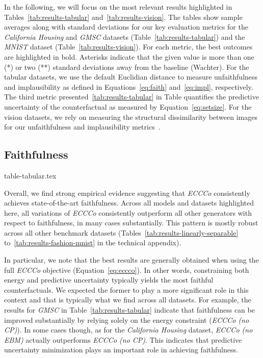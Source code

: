 In the following, we will focus on the most relevant results highlighted in Tables~\ref{tab:results-tabular} and~\ref{tab:results-vision}. The tables show sample averages along with standard deviations for our key evaluation metrics for the \textit{California Housing} and \textit{GMSC} datasets (Table~\ref{tab:results-tabular}) and the \textit{MNIST} dataset (Table~\ref{tab:results-vision}). For each metric, the best outcomes are highlighted in bold. Asterisks indicate that the given value is more than one (*) or two (**) standard deviations away from the baseline (Wachter). For the tabular datasets, we use the default Euclidian distance to measure unfaithfulness and implausibility as defined in Equations~\ref{eq:faith} and~\ref{eq:impl}, respectively. The third metric presented~\ref{tab:results-tabular} in Table quantifies the predictive uncertainty of the counterfactual as measured by Equation~\ref{eq:setsize}. For the vision datasets, we rely on measuring the structural dissimilarity between images for our unfaithfulness and implausibility metrics~\citep{wang2003multiscale}. 

\subsection{Faithfulness}

{table-tabular.tex}

Overall, we find strong empirical evidence suggesting that \textit{ECCCo} consistently achieves state-of-the-art faithfulness. Across all models and datasets highlighted here, all variations of \textit{ECCCo} consistently outperform all other generators with respect to faithfulness, in many cases substantially. This pattern is mostly robust across all other benchmark datasets (Tables~\ref{tab:results-linearly-separable} to~\ref{tab:results-fashion-mnist} in the technical appendix). 

In particular, we note that the best results are generally obtained when using the full \textit{ECCCo} objective (Equation~\ref{eq:eccco}). In other words, constraining both energy and predictive uncertainty typically yields the most faithful counterfactuals. We expected the former to play a more significant role in this context and that is typically what we find across all datasets. For example, the results for \textit{GMSC} in Table~\ref{tab:results-tabular} indicate that faithfulness can be improved substantially by relying solely on the energy constraint (\textit{ECCCo (no CP)}). In some cases though, as for the \textit{California Housing} dataset, \textit{ECCCo (no EBM)} actually outperforms \textit{ECCCo (no CP)}. This indicates that predictive uncertainty minimization plays an important role in achieving faithfulness. 

